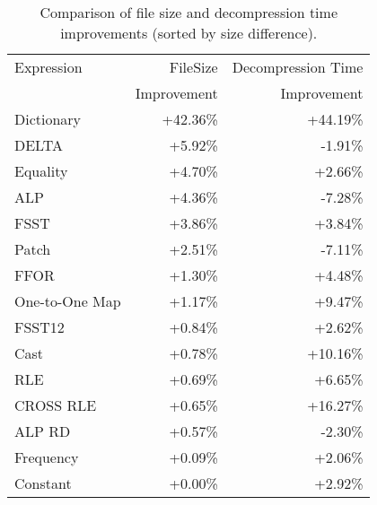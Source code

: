 \begin{table}[ht]
\centering
\begin{tabular}{l r r}
\toprule
Expression & FileSize & Decompression Time \\
  & Improvement & Improvement \\
\midrule
Dictionary & +42.36\% & +44.19\% \\
DELTA & +5.92\% & -1.91\% \\
Equality & +4.70\% & +2.66\% \\
ALP & +4.36\% & -7.28\% \\
FSST & +3.86\% & +3.84\% \\
Patch & +2.51\% & -7.11\% \\
FFOR & +1.30\% & +4.48\% \\
One-to-One Map & +1.17\% & +9.47\% \\
FSST12 & +0.84\% & +2.62\% \\
Cast & +0.78\% & +10.16\% \\
RLE & +0.69\% & +6.65\% \\
CROSS RLE & +0.65\% & +16.27\% \\
ALP RD & +0.57\% & -2.30\% \\
Frequency & +0.09\% & +2.06\% \\
Constant & +0.00\% & +2.92\% \\
\bottomrule
\end{tabular}
\caption{Comparison of file size and decompression time improvements (sorted by size difference).}
\label{tab:compression-decomptime-diff}
\end{table}
